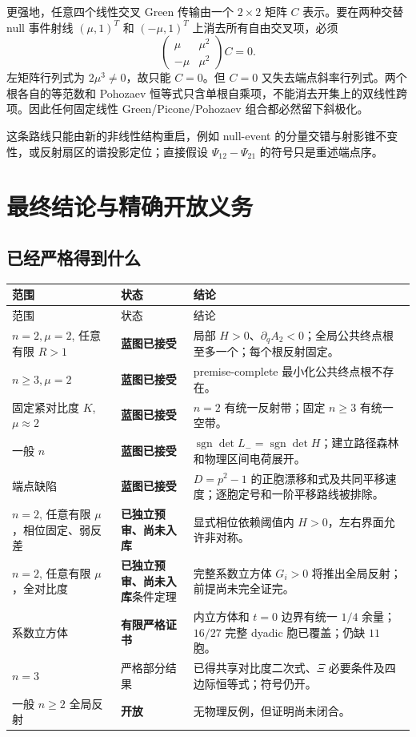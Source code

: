 \documentclass[UTF8,12pt,openany,fontset=fandol]{ctexrep}
\theoremstyle{definition}
\newcommand{\sgn}{\operatorname{sgn}}
\newcommand{\Trusted}{\textcolor{green!45!black}{\textbf{蓝图已接受}}}
\newcommand{\Reviewed}{\textcolor{blue!65!black}{\textbf{已独立预审、尚未入库}}}
\newcommand{\Certified}{\textcolor{violet!70!black}{\textbf{有限严格证书}}}
\newcommand{\Open}{\textcolor{red!65!black}{\textbf{开放}}}
\begin{document}
更强地，任意四个线性交叉 Green 传输由一个 $2\times2$ 矩阵 $C$ 表示。要在两种交替 null 事件射线 $(\mu,1)^T$ 和 $(-\mu,1)^T$ 上消去所有自由交叉项，必须
\begin{equation}
 \begin{pmatrix}\mu&\mu^2\\-\mu&\mu^2\end{pmatrix}C=0.
\end{equation}
左矩阵行列式为 $2\mu^3\ne0$，故只能 $C=0$。但 $C=0$ 又失去端点斜率行列式。两个根各自的等范数和 Pohozaev 恒等式只含单根自乘项，不能消去开集上的双线性跨项。因此任何固定线性 Green/Picone/Pohozaev 组合都必然留下斜极化。

这条路线只能由新的非线性结构重启，例如 null-event 的分量交错与射影锥不变性，或反射扇区的谱投影定位；直接假设 $\Psi_{12}-\Psi_{21}$ 的符号只是重述端点序。

\chapter{最终结论与精确开放义务}

\section{已经严格得到什么}

\begin{longtable}{p{}p{}p{}}
\toprule
范围 & 状态 & 结论\\
\midrule
\endfirsthead
\toprule
范围 & 状态 & 结论\\
\midrule
\endhead
$n=2,\mu=2$, 任意有限 $R>1$ & \Trusted & 局部 $H>0$、$\partial_qA_2<0$；全局公共终点根至多一个；每个根反射固定。\\
$n\ge3,\mu=2$ & \Trusted & premise-complete 最小化公共终点根不存在。\\
固定紧对比度 $K$, $\mu\approx2$ & \Trusted & $n=2$ 有统一反射带；固定 $n\ge3$ 有统一空带。\\
一般 $n$ & \Trusted & $\sgn\det L_-=\sgn\det H$；建立路径森林和物理区间电荷展开。\\
端点缺陷 & \Trusted & $D=p^2-1$ 的正胞漂移和式及共同平移速度；逐胞定号和一阶平移路线被排除。\\
$n=2$, 任意有限 $\mu$，相位固定、弱反差 & \Reviewed & 显式相位依赖阈值内 $H>0$，左右界面允许非对称。\\
$n=2$, 任意有限 $\mu$，全对比度 & \Reviewed 条件定理 & 完整系数立方体 $G_i>0$ 将推出全局反射；前提尚未完全证完。\\
系数立方体 & \Certified & 内立方体和 $t=0$ 边界有统一 $1/4$ 余量；$16/27$ 完整 dyadic 胞已覆盖；仍缺 $11$ 胞。\\
$n=3$ & 严格部分结果 & 已得共享对比度二次式、$\Xi$ 必要条件及四边际恒等式；符号仍开。\\
一般 $n\ge2$ 全局反射 & \Open & 无物理反例，但证明尚未闭合。\\
\bottomrule
\end{longtable}
\end{document}
